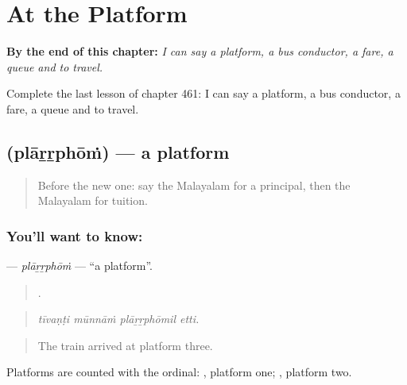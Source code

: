
\chapter{At the Platform}
\label{ch:ml-at-the-platform}

\begin{chapteropening}
\textbf{By the end of this chapter:} \emph{I can say a platform, a bus conductor, a fare, a queue and to travel.}

Complete the last lesson of chapter 461: I can say a platform, a bus conductor, a fare, a queue and to travel.
\end{chapteropening}

\section[\texorpdfstring{\ml{പ്ലാറ്റ്ഫോം} (plāṟṟphōṁ)}{പ്ലാറ്റ്ഫോം (plāṟṟphōṁ)}]{ (plāṟṟphōṁ) — a platform}

\label{lesson:ML-C461-plarrphom}



\begin{quote}
Before the new one: say the Malayalam for a principal, then the Malayalam for tuition.
\end{quote}

\subsection*{You'll want to know: }
\textbf{} — \emph{plāṟṟphōṁ} — \textquotedblleft{}a platform\textquotedblright{}.

\begin{quote}
   .
\end{quote}

\begin{quote}
\emph{tīvaṇṭi mūnnāṁ plāṟṟphōmil etti.}
\end{quote}

\begin{quote}
The train arrived at platform three.
\end{quote}

Platforms are counted with the ordinal:  , platform one;  , platform two.


